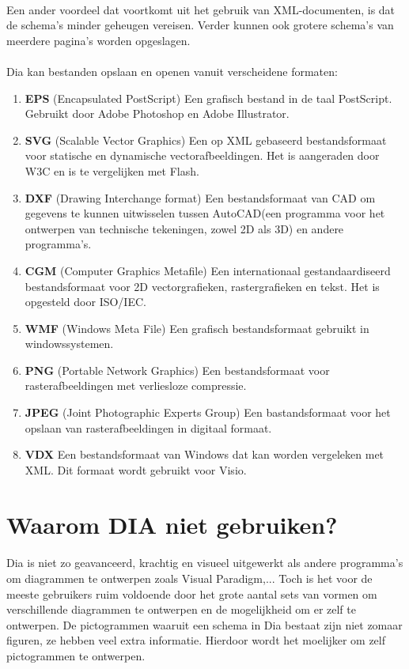 \documentclass[12pt,a4paper]{report}
\begin{document}
\begin{flushleft}
\paragraph*{}
Een ander voordeel dat voortkomt uit het gebruik van XML-documenten, is dat de schema's minder geheugen vereisen. Verder kunnen ook grotere schema's van meerdere pagina's worden opgeslagen.
\paragraph*{}
Dia kan bestanden opslaan en openen vanuit verscheidene formaten:
\begin{enumerate}
\item \textbf{EPS} (Encapsulated PostScript) Een grafisch bestand in de taal PostScript. Gebruikt door Adobe Photoshop en Adobe Illustrator.
\item \textbf{SVG} (Scalable Vector Graphics) Een op XML gebaseerd bestandsformaat voor statische en dynamische vectorafbeeldingen. Het is aangeraden door W3C en is te vergelijken met Flash.
\item \textbf{DXF} (Drawing Interchange format) Een bestandsformaat van CAD om gegevens te kunnen uitwisselen tussen AutoCAD(een programma voor het ontwerpen van technische tekeningen, zowel 2D als 3D) en andere programma's.
\item \textbf{CGM} (Computer Graphics Metafile) Een internationaal gestandaardiseerd bestandsformaat voor 2D vectorgrafieken, rastergrafieken en tekst. Het is opgesteld door ISO/IEC.
\item \textbf{WMF} (Windows Meta File) Een grafisch bestandsformaat gebruikt in windowssystemen.
\item \textbf{PNG} (Portable Network Graphics) Een bestandsformaat voor rasterafbeeldingen met verliesloze compressie. 
\item \textbf{JPEG} (Joint Photographic Experts Group) Een bastandsformaat voor het opslaan van rasterafbeeldingen in digitaal formaat.
\item \textbf{VDX} Een bestandsformaat van Windows dat kan worden vergeleken met XML. Dit formaat wordt gebruikt voor Visio.
\end{enumerate}
\section{Waarom DIA niet gebruiken?}
\paragraph*{}
Dia is niet zo geavanceerd, krachtig en visueel uitgewerkt als andere programma's om diagrammen te ontwerpen zoals Visual Paradigm,... Toch is het voor de meeste gebruikers ruim voldoende door het grote aantal sets van vormen om verschillende diagrammen te ontwerpen en de mogelijkheid om er zelf te ontwerpen. De pictogrammen waaruit een schema in Dia bestaat zijn niet zomaar figuren, ze hebben veel extra informatie. Hierdoor wordt het moelijker om zelf pictogrammen te ontwerpen. 

\end{flushleft}
\end{document}
